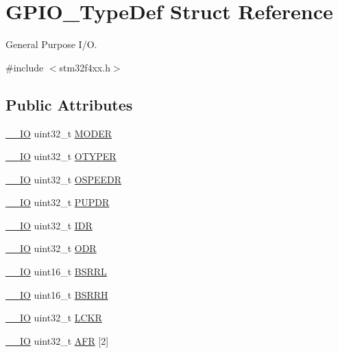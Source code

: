 \hypertarget{struct_g_p_i_o___type_def}{}\section{G\+P\+I\+O\+\_\+\+Type\+Def Struct Reference}
\label{struct_g_p_i_o___type_def}


General Purpose I/O.  




{\ttfamily \#include $<$stm32f4xx.\+h$>$}

\subsection*{Public Attributes}
\begin{DoxyCompactItemize}
\item 
\hyperlink{core__cm4_8h_aec43007d9998a0a0e01faede4133d6be}{\+\_\+\+\_\+\+IO} uint32\+\_\+t \hyperlink{struct_g_p_i_o___type_def_ac2505d096b6b650f1647b8e0ff8b196b}{M\+O\+D\+ER}
\item 
\hyperlink{core__cm4_8h_aec43007d9998a0a0e01faede4133d6be}{\+\_\+\+\_\+\+IO} uint32\+\_\+t \hyperlink{struct_g_p_i_o___type_def_a910885e4d881c3a459dd11640237107f}{O\+T\+Y\+P\+ER}
\item 
\hyperlink{core__cm4_8h_aec43007d9998a0a0e01faede4133d6be}{\+\_\+\+\_\+\+IO} uint32\+\_\+t \hyperlink{struct_g_p_i_o___type_def_a0d233d720f18ae2050f9131fa6faf7c6}{O\+S\+P\+E\+E\+DR}
\item 
\hyperlink{core__cm4_8h_aec43007d9998a0a0e01faede4133d6be}{\+\_\+\+\_\+\+IO} uint32\+\_\+t \hyperlink{struct_g_p_i_o___type_def_a44ada3bfbe891e2efc1e06bda4c8014e}{P\+U\+P\+DR}
\item 
\hyperlink{core__cm4_8h_aec43007d9998a0a0e01faede4133d6be}{\+\_\+\+\_\+\+IO} uint32\+\_\+t \hyperlink{struct_g_p_i_o___type_def_acf11156409414ad8841bb0b62959ee96}{I\+DR}
\item 
\hyperlink{core__cm4_8h_aec43007d9998a0a0e01faede4133d6be}{\+\_\+\+\_\+\+IO} uint32\+\_\+t \hyperlink{struct_g_p_i_o___type_def_a6fb78f4a978a36032cdeac93ac3c9c8b}{O\+DR}
\item 
\hyperlink{core__cm4_8h_aec43007d9998a0a0e01faede4133d6be}{\+\_\+\+\_\+\+IO} uint16\+\_\+t \hyperlink{struct_g_p_i_o___type_def_ad2528bbb921532be8116534651b1faee}{B\+S\+R\+RL}
\item 
\hyperlink{core__cm4_8h_aec43007d9998a0a0e01faede4133d6be}{\+\_\+\+\_\+\+IO} uint16\+\_\+t \hyperlink{struct_g_p_i_o___type_def_ad4b5f8bc936e26e3980686d2aba9d882}{B\+S\+R\+RH}
\item 
\hyperlink{core__cm4_8h_aec43007d9998a0a0e01faede4133d6be}{\+\_\+\+\_\+\+IO} uint32\+\_\+t \hyperlink{struct_g_p_i_o___type_def_a95a59d4b1d52be521f3246028be32f3e}{L\+C\+KR}
\item 
\hyperlink{core__cm4_8h_aec43007d9998a0a0e01faede4133d6be}{\+\_\+\+\_\+\+IO} uint32\+\_\+t \hyperlink{struct_g_p_i_o___type_def_a2245603433e102f0fd8a85f7de020755}{A\+FR} \mbox{[}2\mbox{]}
\end{DoxyCompactItemize}


